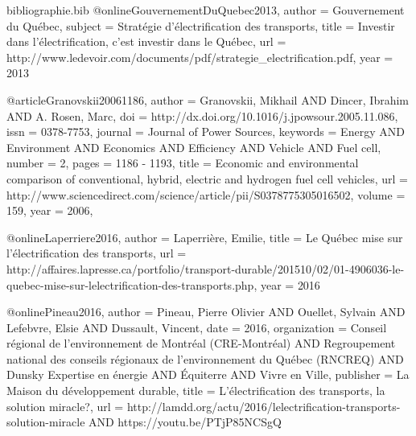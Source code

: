 \begin{filecontents}{bibliographie.bib}
    @online{GouvernementDuQuebec2013,
        author  = {Gouvernement du Québec},
        subject = {Stratégie d’électrification des transports},
        title   = {Investir dans l’électrification, c’est investir dans le Québec},
        url     = {http://www.ledevoir.com/documents/pdf/strategie_electrification.pdf},
        year    = {2013}
    }

    @article{Granovskii20061186,
        author   = {Granovskii, Mikhail AND Dincer, Ibrahim AND A. Rosen, Marc},
        doi      = {http://dx.doi.org/10.1016/j.jpowsour.2005.11.086},
        issn     = {0378-7753},
        journal  = {Journal of Power Sources},
        keywords = {Energy AND Environment AND Economics AND Efficiency AND Vehicle AND Fuel cell},
        number   = {2},
        pages    = {1186 - 1193},
        title    = {Economic and environmental comparison of conventional, hybrid, electric and hydrogen fuel cell vehicles},
        url      = {http://www.sciencedirect.com/science/article/pii/S0378775305016502},
        volume   = {159},
        year     = {2006},
    }

    @online{Laperriere2016,
        author = {Laperrière, Emilie},
        title  = {Le Québec mise sur l'électrification des transports},
        url    = {http://affaires.lapresse.ca/portfolio/transport-durable/201510/02/01-4906036-le-quebec-mise-sur-lelectrification-des-transports.php},
        year   = {2016}
    }

    @online{Pineau2016,
        author       = {Pineau, Pierre Olivier AND Ouellet, Sylvain AND Lefebvre, Elsie AND Dussault, Vincent},
        date         = {2016},
        organization = {Conseil régional de l’environnement de Montréal (CRE-Montréal) AND Regroupement national des conseils régionaux de l’environnement du Québec (RNCREQ) AND Dunsky Expertise en énergie AND Équiterre AND Vivre en Ville},
        publisher    = {La Maison du développement durable},
        title        = {L'électrification des transports, la solution miracle?},
        url          = {http://lamdd.org/actu/2016/lelectrification-transports-solution-miracle AND https://youtu.be/PTjP85NCSgQ}
    }
\end{filecontents}
